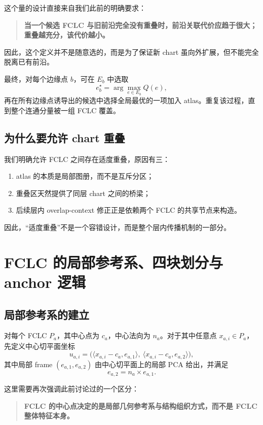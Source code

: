\documentclass[12pt,a4paper]{ctexart}
\begin{document}
这个量的设计直接来自我们此前的明确要求：

\begin{quote}
\textbf{当一个候选 FCLC 与旧前沿完全没有重叠时，前沿关联代价应趋于很大；重叠越充分，该代价越小。}
\end{quote}

因此，这个定义并不是随意选的，而是为了保证新 chart 虽向外扩展，但不能完全脱离已有前沿。

最终，对每个边缘点 \(b\)，可在 \(E_b\) 中选取
\[
e_b^\star=\arg\max_{e\in E_b}Q(e),
\]
再在所有边缘点诱导出的候选中选择全局最优的一项加入 atlas。重复该过程，直到整个连通分量被一组 FCLC 覆盖。

\subsection{为什么要允许 chart 重叠}

我们明确允许 FCLC 之间存在适度重叠，原因有三：

\begin{enumerate}[leftmargin=2em]
    \item atlas 的本质是局部图册，而不是互斥分区；
    \item 重叠区天然提供了同层 chart 之间的桥梁；
    \item 后续层内 overlap-context 修正正是依赖两个 FCLC 的共享节点来构造。
\end{enumerate}

因此，“适度重叠”不是一个容错设计，而是整个层内传播机制的一部分。

\section{FCLC 的局部参考系、四块划分与 anchor 逻辑}

\subsection{局部参考系的建立}

对每个 FCLC \(P_a\)，其中心点为 \(c_a\)，中心法向为 \(n_a\)。对于其中任意点 \(x_{a,i}\in P_a\)，先定义中心切平面坐标
\[
u_{a,i}
=
\big(
\langle x_{a,i}-c_a,e_{a,1}\rangle,\
\langle x_{a,i}-c_a,e_{a,2}\rangle
\big),
\]
其中局部 frame \((e_{a,1},e_{a,2})\) 由中心切平面上的局部 PCA 给出，并满足
\[
e_{a,2}=n_a\times e_{a,1}.
\]

这里需要再次强调此前讨论过的一个区分：

\begin{quote}
\textbf{FCLC 的中心点决定的是局部几何参考系与结构组织方式，而不是 FCLC 整体特征本身。}
\end{quote}
\end{document}
